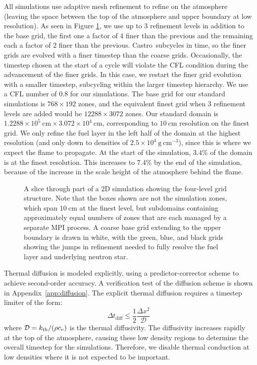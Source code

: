 \documentclass[preprint,times,tighten]{aastex63}
\newcommand{\kth}{k_{\rm th}}
\newcommand{\castro}{{\sf Castro}}
\newcommand{\gcc}{\mathrm{g~cm^{-3} }}
\newcommand{\MarginPar}[1]{
    \marginpar{\vskip-\baselineskip%
               \raggedright%
               \tiny\sffamily%
               {\color{red}\hrule%
               \smallskip%
               #1\par%
               \smallskip%
               \hrule}}%
}
\begin{document}
All simulations use adaptive mesh refinement to refine on the
atmosphere (leaving the space between the top of the atmosphere and
upper boundary at low resolution). As seen in Figure \ref{fig:grids}, 
we use up to 3 refinement levels in addition to the base grid, the first
one a factor of 4 finer than the previous and the remaining each a
factor of 2 finer than the previous. \castro\ subcycles in time, so the 
finer grids are evolved with a finer timestep than the coarse grids. 
Occasionally, the timestep chosen at the start of a cycle will violate
the CFL condition during the advancement of the finer grids. In this
case, we restart the finer grid evolution with a smaller timestep,
subcycling within the larger timestep hierarchy.  We use a CFL number
of 0.8 for our simulations.  
The base grid for our standard
simulations is $768\times 192$ zones, and the equivalent finest grid
when 3 refinement levels are added would be $12288\times 3072$ zones.
Our standard domain is $1.2288\times 10^5~\mathrm{cm} \times
3.072\times 10^4~\mathrm{cm}$, corresponding to $10~\mathrm{cm}$ resolution
on the finest grid.  We only refine the fuel layer in the left half of
the domain at the highest resolution (and only down to densities of
$2.5\times 10^4~\gcc$), since this is where we expect the flame to
propagate.  At the start of the simulation, $3.4\%$ of the domain is
at the finest resolution.  This increases to $7.4\%$ by the end of the
simulation, because of the increase in the scale height of the atmosphere
behind the flame.

\begin{figure}[t]
	\caption{\label{fig:grids}A slice through part of a 2D simulation showing the four-level
		grid structure. Note that the boxes shown are not the simulation zones, which span
		$10~\mathrm{cm}$ at the finest level, but subdomains containing approximately equal
		numbers of zones that are each managed by a separate MPI process. A coarse base grid
		extending to the upper boundary is drawn in white, with the green, blue, and black
		grids showing the jumps in refinement needed to fully resolve the fuel layer and
		underlying neutron star.}
\end{figure}

Thermal diffusion is modeled explicitly, using a predictor-corrector
scheme to achieve second-order accuracy.  A verification test of the
diffusion scheme is shown in Appendix~\ref{app:diffusion}.  The
explicit thermal diffusion requires a timestep limiter of the form:
\begin{equation}
\Delta t_\mathrm{diff} \le \frac{1}{2} \frac{\Delta x^2}{\mathcal{D}}
\end{equation}
where $\mathcal{D} = \kth/(\rho c_v)$ is the thermal diffusivity.  The
diffusivity increases rapidly at the top of the atmosphere, causing
these low density regions to determine the overall timestep for the
simulations.  Therefore, we disable thermal conduction at low
densities where it is not expected to be important.
\end{document}
